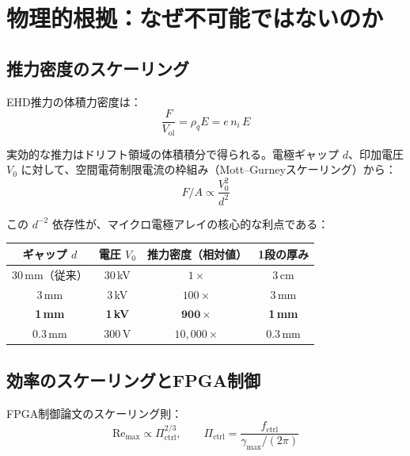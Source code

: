 \documentclass[12pt,a4paper]{ltjsarticle}
\begin{document}
\section{物理的根拠：なぜ不可能ではないのか}

\subsection{推力密度のスケーリング}

EHD推力の体積力密度は：
\begin{equation}
  \frac{F}{V_{\mathrm{ol}}} = \rho_q E = e\, n_i\, E
  \label{eq:thrust_density}
\end{equation}

実効的な推力はドリフト領域の体積積分で得られる。電極ギャップ $d$、印加電圧 $V_0$ に対して、空間電荷制限電流の枠組み（Mott--Gurneyスケーリング）から：
\begin{equation}
  F/A \propto \frac{V_0^2}{d^2}
  \label{eq:FA_scaling}
\end{equation}

この $d^{-2}$ 依存性が、マイクロ電極アレイの核心的な利点である：

\begin{center}
\sffamily\small
\begin{tabular}{@{}cccc@{}}
\toprule
\textbf{ギャップ $d$} & \textbf{電圧 $V_0$} & \textbf{推力密度（相対値）} & \textbf{1段の厚み} \\
\midrule
30\,mm（従来） & 30\,kV & $1\times$ & 3\,cm \\
3\,mm & 3\,kV & $100\times$ & 3\,mm \\
\textbf{1\,mm} & \textbf{1\,kV} & $\mathbf{900\times}$ & \textbf{1\,mm} \\
0.3\,mm & 300\,V & $10{,}000\times$ & 0.3\,mm \\
\bottomrule
\end{tabular}
\end{center}

\subsection{効率のスケーリングとFPGA制御}

FPGA制御論文のスケーリング則：
\begin{equation}
  \mathrm{Re}_{\max} \propto \Pi_{\mathrm{ctrl}}^{2/3}, \qquad
  \Pi_{\mathrm{ctrl}} = \frac{f_{\mathrm{ctrl}}}{\gamma_{\max}/(2\pi)}
  \label{eq:scaling}
\end{equation}
\end{document}
